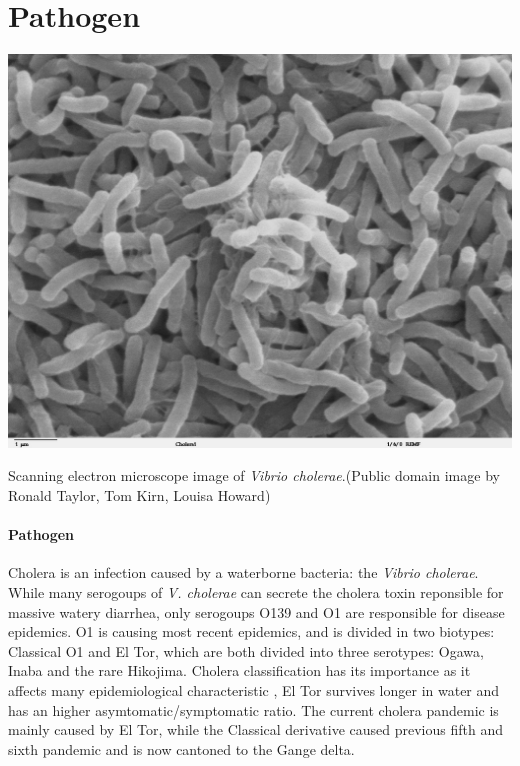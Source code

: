 \section{Pathogen} 
\begin{marginfigure}[3\baselineskip]
\centering
\includegraphics{fig/vibrio}
\caption[Vibrio cholerae bacteria]{Scanning electron microscope image of \textit{Vibrio cholerae}.\small{(Public domain image by Ronald Taylor, Tom Kirn, Louisa Howard)}}
\label{rain}
\end{marginfigure}

\paragraph{Pathogen} Cholera is an infection caused by a waterborne bacteria: the \emph{Vibrio cholerae}. While many serogoups of \emph{V. cholerae} can secrete the cholera toxin reponsible for massive watery diarrhea, only serogoups O139 and O1 are responsible for disease epidemics. O1 is causing most recent epidemics, and is divided in two biotypes: Classical O1 and El Tor, which are both divided into three serotypes: Ogawa, Inaba and the rare Hikojima\cite{Kaper:Cholera:1995}. Cholera classification has its importance as it affects many epidemiological characteristic \eg, El Tor survives longer in water and has an higher asymtomatic/symptomatic ratio\cite{WHO:CholeraVaccinesWHO:2017}. The current cholera pandemic is mainly caused by El Tor, while the Classical derivative caused previous fifth and sixth pandemic and is now cantoned to the Gange delta\cite{Nair:CholeraDueAltered:2006}. 

